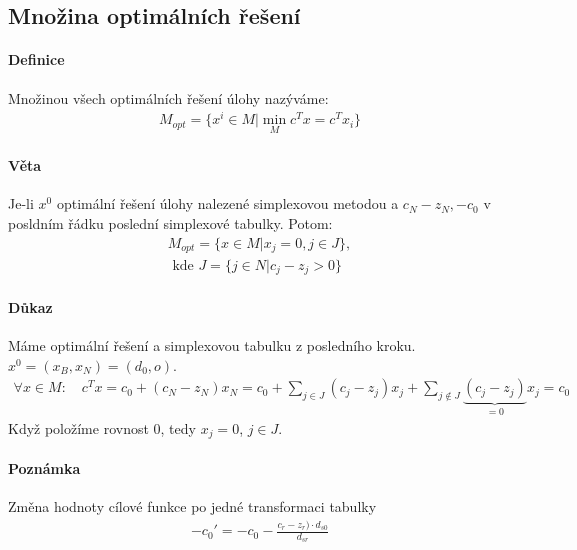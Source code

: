 \documentclass[a4paper,12pt,titlepage]{article}
\begin{document}
\subsection{Množina optimálních řešení}
\setcounter{equation}{0}
\paragraph{Definice}
Množinou všech optimálních řešení úlohy nazýváme:
\begin{align}
	M_{opt} = \{ x^i \in M | \min_M c^Tx = c^Tx_i \}
\end{align}

\paragraph{Věta}
Je-li $x^0$ optimální řešení úlohy nalezené simplexovou metodou a $c_N - z_N,
-c_0$ v posldním řádku poslední simplexové tabulky. Potom:
\begin{align}
	M_{opt} = \{ x \in M | x_j = 0, j \in J \}, \\
	\text{ kde } J = \{j \in N | c_j - z_j > 0 \}
\end{align}
\paragraph{Důkaz}
Máme optimální řešení a simplexovou tabulku z posledního kroku.
$x^0 = (x_B, x_N) = (d_0, o)$.
\begin{align}
	\forall x \in M : \quad c^Tx = c_0 + (c_N - z_N) x_N = c_0 + \sum_{j \in J}
	(c_j - z_j) x_j + \sum_{j \nin J} \underbrace{(c_j - z_j)}_{ = 0} x_j  = c_0
\end{align}
Když položíme rovnost $0$, tedy $x_j = 0$, $j \in J$.
\paragraph{Poznámka}
Změna hodnoty cílové funkce po jedné transformaci tabulky
\begin{align}
	-c_0' = -c_0 - \frac{c_r-z_r) \cdot d_{s0}}{d_{sr}}
\end{align}
\end{document}
